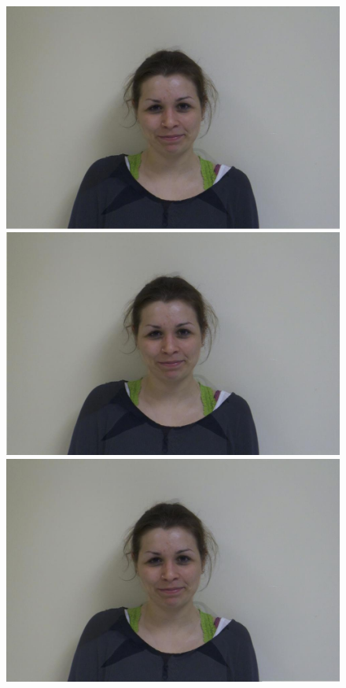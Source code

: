 \documentclass[11pt]{article}
\begin{document}
\begin{figure}[H]
\begin{center}
\includegraphics[scale=0.06]{figs/frames/morph_steinkirch_tangatur_07.jpg} 
\includegraphics[scale=0.06]{figs/frames/morph_steinkirch_tangatur_08.jpg}  
\includegraphics[scale=0.06]{figs/frames/morph_steinkirch_tangatur_09.jpg} 

\end{center}
\end{figure}
\end{document}
